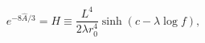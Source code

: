 \begin{equation}
e^{-8\hat A/3}=H\equiv\frac {L^4}{2\lambda r_0^4}\sinh(c-{\lambda}\log f),
\label{eq:h2def}
\end{equation}

